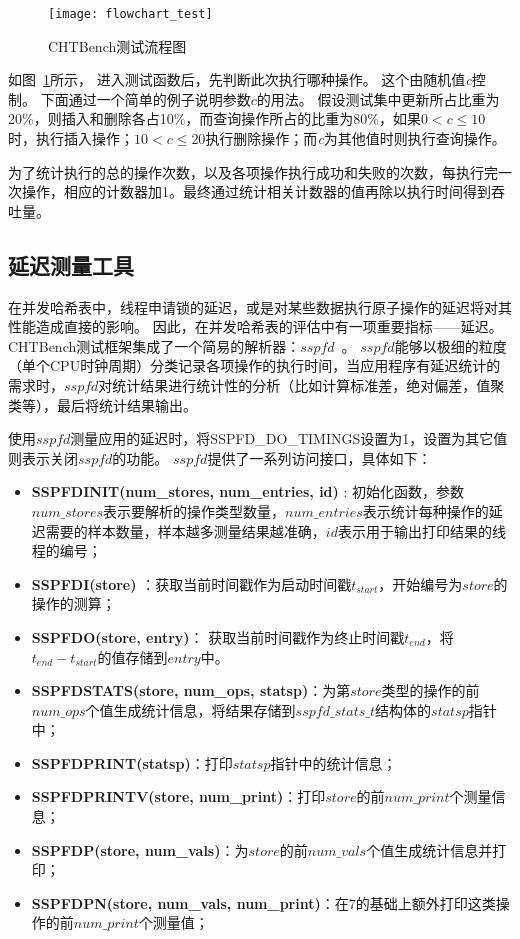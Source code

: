 \begin{figure}[htbp]
\centering
\texttt{[image: flowchart\_test]}
\caption{CHTBench测试流程图}\label{fig:flowchart}
\end{figure}

如图~\ref{fig:flowchart}所示，
进入测试函数后，先判断此次执行哪种操作。
这个由随机值\textit{c}控制。
下面通过一个简单的例子说明参数$c$的用法。
假设测试集中更新所占比重为20\%，则插入和删除各占10\%，而查询操作所占的比重为80\%，如果$0 < c \leq 10$时，执行插入操作；$10 < c \leq 20$执行删除操作；而\textit{c}为其他值时则执行查询操作。

为了统计执行的总的操作次数，以及各项操作执行成功和失败的次数，每执行完一次操作，相应的计数器加1。最终通过统计相关计数器的值再除以执行时间得到吞吐量。

\subsection{延迟测量工具}
在并发哈希表中，线程申请锁的延迟，或是对某些数据执行原子操作的延迟将对其性能造成直接的影响。
因此，在并发哈希表的评估中有一项重要指标——延迟。
CHTBench测试框架集成了一个简易的解析器：$sspfd$~\cite{sspfd}。
$sspfd$能够以极细的粒度（单个CPU时钟周期）分类记录各项操作的执行时间，当应用程序有延迟统计的需求时，$sspfd$对统计结果进行统计性的分析（比如计算标准差，绝对偏差，值聚类等），最后将统计结果输出。

使用$sspfd$测量应用的延迟时，将SSPFD\_DO\_TIMINGS设置为1，设置为其它值则表示关闭$sspfd$的功能。
$sspfd$提供了一系列访问接口，具体如下：
\begin{itemize}
\item[1.] \textbf{SSPFDINIT(num\_stores, num\_entries, id)} : 初始化函数，参数$num\_stores$表示要解析的操作类型数量，$num\_entries$表示统计每种操作的延迟需要的样本数量，样本越多测量结果越准确，$id$表示用于输出打印结果的线程的编号；
\item[2.] \textbf{SSPFDI(store)} ：获取当前时间戳作为启动时间戳$t_{start}$，开始编号为$store$的操作的测算；
\item[3.] \textbf{SSPFDO(store, entry)}： 获取当前时间戳作为终止时间戳$t_{end}$，将$t_{end} - t_{start}$的值存储到$entry$中。
\item[4.] \textbf{SSPFDSTATS(store, num\_ops, statsp)}：为第$store$类型的操作的前$num\_ops$个值生成统计信息，将结果存储到$sspfd\_stats\_t$结构体的$statsp$指针中；
\item[5.] \textbf{SSPFDPRINT(statsp)}：打印$statsp$指针中的统计信息；
\item[6.] \textbf{SSPFDPRINTV(store, num\_print)}：打印$store$的前$num\_print$个测量信息；
\item[7.] \textbf{SSPFDP(store, num\_vals)}：为$store$的前$num\_vals$个值生成统计信息并打印；
\item[8.] \textbf{SSPFDPN(store, num\_vals, num\_print)}：在7的基础上额外打印这类操作的前$num\_print$个测量值；
\end{itemize}
